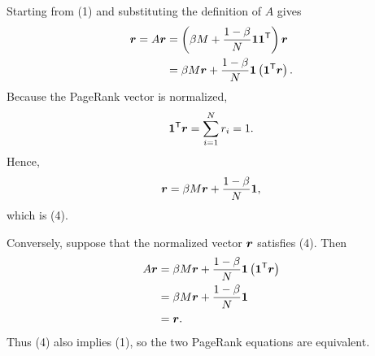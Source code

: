 \begin{solution}
Starting from (1) and substituting the definition of $A$ gives
\begin{align*}
  \bm{r}
  =A\bm{r}
  &=\left(
      \beta M+\frac{1-\beta}{N}
      \bm{1}\bm{1}^{\mathsf T}
    \right)\bm{r}\\
  &=\beta M\bm{r}
    +\frac{1-\beta}{N}
      \bm{1}\left(\bm{1}^{\mathsf T}\bm{r}\right).
\end{align*}
Because the PageRank vector is normalized,
\[
  \bm{1}^{\mathsf T}\bm{r}
  =\sum_{i=1}^{N}r_i=1.
\]
Hence,
\[
  \bm{r}
  =\beta M\bm{r}
   +\frac{1-\beta}{N}\bm{1},
\]
which is (4).

Conversely, suppose that the normalized vector $\bm{r}$ satisfies (4).
Then
\begin{align*}
  A\bm{r}
  &=\beta M\bm{r}
    +\frac{1-\beta}{N}
      \bm{1}\left(\bm{1}^{\mathsf T}\bm{r}\right)\\
  &=\beta M\bm{r}
    +\frac{1-\beta}{N}\bm{1}\\
  &=\bm{r}.
\end{align*}
Thus (4) also implies (1), so the two PageRank equations are equivalent.
\end{solution}
